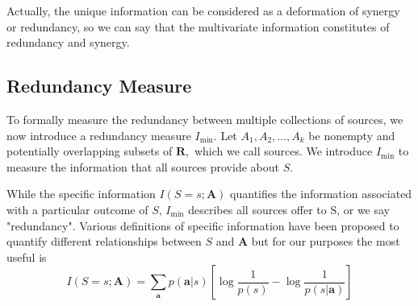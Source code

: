 Actually, the unique information can be considered as a deformation of synergy or redundancy, so we can say that the multivariate information constitutes of redundancy and synergy.





\subsection{Redundancy Measure}

To formally measure the redundancy between multiple collections of sources, we now introduce a redundancy measure $I_{\min}$. Let $A_1, A_2, \ldots, A_k$ be nonempty and potentially overlapping subsets of $\mathbf{R},$ which we call sources. We introduce $I_{\min}$ to measure the information that all sources provide about $S$.

While the specific information $I(S=s ; \mathbf{A})$ quantifies the information associated with a particular outcome of $S$, $I_{\min}$ describes all sources offer to S, or we say "redundancy". Various definitions of specific information have been proposed to quantify different relationships between $S$ and $\mathbf{A}$ but for our purposes the most useful is
\begin{equation}
I(S=s ; \mathbf{A})=\sum_{\mathbf{a}} p(\mathbf{a} | s)\left[\log\frac{1}{p(s)}-\log\frac{1}{p(s |\mathbf{a})}\right]
\end{equation}

